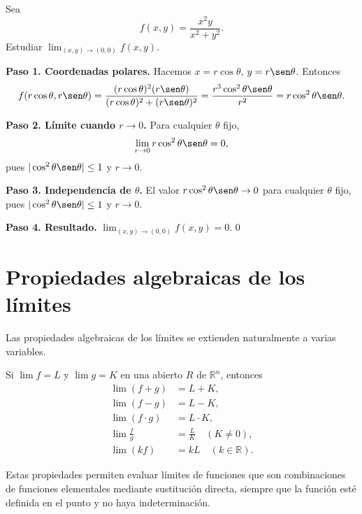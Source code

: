 \begin{example}
Sea
\[
f(x,y) = \frac{x^2 y}{x^2 + y^2}.
\]
Estudiar $\lim_{(x,y)\to(0,0)} f(x,y)$.
\begin{myproof}
\textbf{Paso 1. Coordenadas polares.} Hacemos $x=r\cos\theta$,
$y=r\sen\theta$. Entonces
\[
f(r\cos\theta, r\sen\theta)
= \frac{(r\cos\theta)^2(r\sen\theta)}
       {(r\cos\theta)^2+(r\sen\theta)^2}
= \frac{r^3\cos^2\theta\sen\theta}{r^2}
= r\cos^2\theta\sen\theta.
\]

\textbf{Paso 2. Límite cuando $r\to 0$.}
Para cualquier $\theta$ fijo,
\[
\lim_{r\to 0} r\cos^2\theta\sen\theta = 0,
\]
pues $|\cos^2\theta\sen\theta| \leq 1$ y $r\to 0$.

\textbf{Paso 3. Independencia de $\theta$.}
El valor $r\cos^2\theta\sen\theta\to 0$ para cualquier $\theta$ fijo,
pues $|\cos^2\theta\sen\theta|\leq 1$ y $r\to 0$.

\textbf{Paso 4. Resultado.}
$\displaystyle\lim_{(x,y)\to(0,0)} f(x,y) = 0$.
$\boxed{0}$
\end{myproof}
\end{example}




\section{Propiedades algebraicas de los límites}

Las propiedades algebraicas de los límites se extienden naturalmente a
varias variables.
\begin{theorem}
Si $\lim f=L$ y $\lim g=K$ en una abierto $R$ de $\mathbb{R}^n$, entonces
\[
\begin{aligned}
\lim (f+g) &= L+K,\\
\lim (f-g) &= L-K,\\
\lim (f\cdot g) &= L\cdot K,\\
\lim \frac{f}{g} &= \frac{L}{K} \quad (K\neq 0),\\
\lim (k f) &= kL \quad (k\in\mathbb{R}).
\end{aligned}
\]
\end{theorem}
Estas propiedades permiten evaluar límites de funciones que son
combinaciones de funciones elementales mediante sustitución directa,
siempre que la función esté definida en el punto y no haya
indeterminación.

